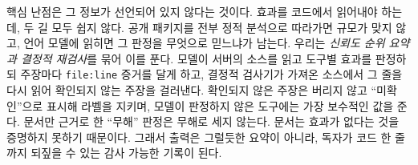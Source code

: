 \documentclass[acmsmall,screen,review,anonymous]{acmart}
\begin{document}
핵심 난점은 그 정보가 선언되어 있지 않다는 것이다. 효과를 코드에서 읽어내야 하는데, 두 길 모두 쉽지 않다. 공개 패키지를 전부 정적 분석으로 따라가면 규모가 맞지 않고, 언어 모델에 읽히면 그 판정을 무엇으로 믿느냐가 남는다. 우리는 \emph{신뢰도 순위 요약과 결정적 재검사}를 묶어 이를 푼다. 모델이 서버의 소스를 읽고 도구별 효과를 판정하되 주장마다 \texttt{file:line} 증거를 달게 하고, 결정적 검사기가 가져온 소스에서 그 줄을 다시 읽어 확인되지 않는 주장을 걸러낸다. 확인되지 않은 주장은 버리지 않고 ``미확인''으로 표시해 라벨을 지키며, 모델이 판정하지 않은 도구에는 가장 보수적인 값을 준다. 문서만 근거로 한 ``무해'' 판정은 무해로 세지 않는다. 문서는 효과가 없다는 것을 증명하지 못하기 때문이다. 그래서 출력은 그럴듯한 요약이 아니라, 독자가 코드 한 줄까지 되짚을 수 있는 감사 가능한 기록이 된다.

\end{document}
